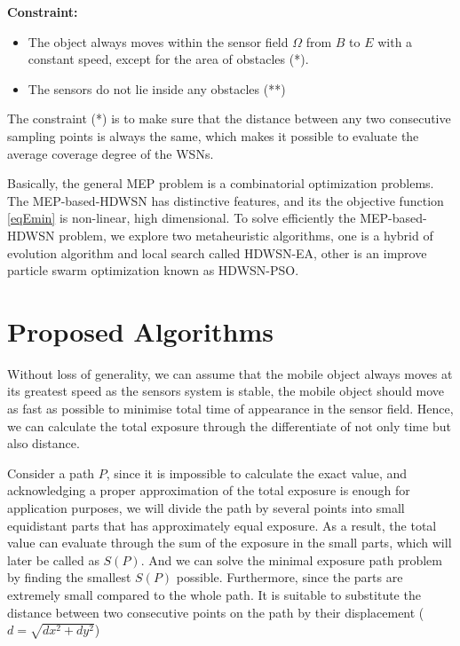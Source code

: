 \documentclass[final]{elsarticle}
\begin{document}
\textbf{Constraint:}	
\begin{itemize}
	\item The object always moves within the sensor field $\Omega $ from $B$ to $E$ with a constant speed, except for the area of obstacles (*).
	\item The sensors do not lie inside any obstacles (**)
\end{itemize}
The constraint (*) is to make sure that the distance between any two consecutive sampling points is always the same, which makes it possible to evaluate the average coverage degree of the WSNs.
	
Basically, the general MEP problem is a combinatorial optimization problems. The MEP-based-HDWSN has distinctive features, and its the objective function \eqref{eqEmin} is non-linear, high dimensional. To solve efficiently the MEP-based-HDWSN problem, we explore two metaheuristic algorithms, one is a hybrid of evolution algorithm and local search called HDWSN-EA, other is an improve particle swarm optimization known as HDWSN-PSO.
\section{Proposed Algorithms}

Without loss of generality, we can assume that the mobile object always moves at its greatest speed as the sensors system is stable, the mobile object should move as fast as possible to minimise total time of appearance in the sensor field. Hence, we can calculate the total exposure through the differentiate of not only time but also distance. %

Consider a path $P$, since it is impossible to calculate the exact value, and acknowledging a proper approximation of the total exposure is enough for application purposes, we will divide the path by several points into small equidistant parts that has approximately equal exposure. As a result, the total value can evaluate through the sum of the exposure in the small parts, which will later be called as $S(P)$. And we can solve the minimal exposure path problem by finding the smallest $S(P)$ possible. Furthermore, since the parts are extremely small compared to the whole path. It is suitable to substitute the distance between two consecutive points on the path by their displacement ($d = \sqrt{dx ^ 2 + dy ^ 2}$)
\end{document}
